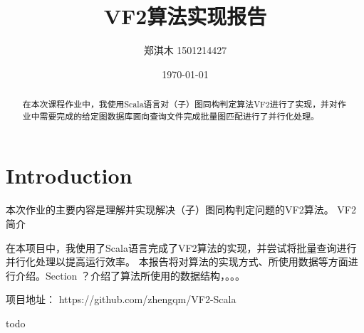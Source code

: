 \documentclass{article}
\title{VF2算法实现报告}
\author{郑淇木  1501214427}
\date{\today}
\begin{document}
\maketitle

\begin{abstract}
在本次课程作业中，我使用Scala语言对（子）图同构判定算法VF2进行了实现，并对作业中需要完成的给定图数据库面向查询文件完成批量图匹配进行了并行化处理。

\end{abstract}


\section{Introduction}
本次作业的主要内容是理解并实现解决（子）图同构判定问题的VF2算法\cite{vf2}。
VF2简介

在本项目中，我使用了Scala语言完成了VF2算法的实现，并尝试将批量查询进行并行化处理以提高运行效率。
本报告将对算法的实现方式、所使用数据等方面进行介绍。Section ？介绍了算法所使用的数据结构，。。。

项目地址： https://github.com/zhengqm/VF2-Scala


\begin{thebibliography}{9}

  todo

\end{thebibliography}
\end{document}

